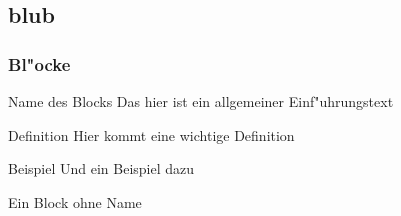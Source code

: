 \documentclass{beamer}
\begin{document}
\subsection{blub}
\begin{frame}
 \frametitle{Bl"ocke}

 \begin{block}{Name des Blocks}
	Das hier ist ein allgemeiner Einf"uhrungstext
 \end{block}

 \begin{alertblock}{Definition}
	Hier kommt eine wichtige Definition
 \end{alertblock}

 \begin{exampleblock}{Beispiel}
 	Und ein Beispiel dazu

 \end{exampleblock}

 \begin{block}{}
	Ein Block ohne Name
 \end{block}

\end{frame}
\end{document}
